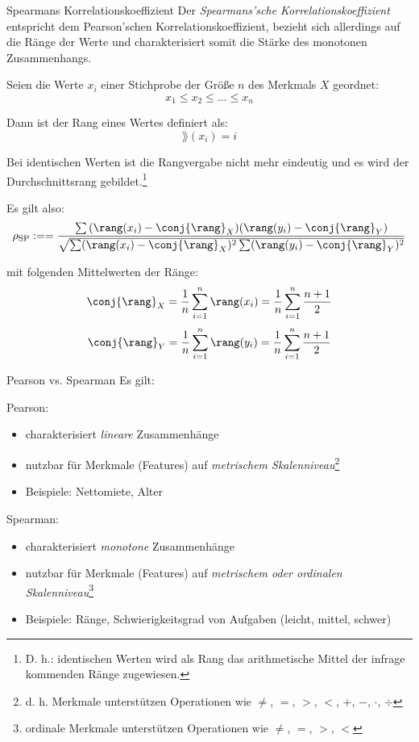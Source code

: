 \begin{defi}{Spearmans Korrelationskoeffizient}
    Der \emph{Spearmans'sche Korrelationskoeffizient} entspricht dem Pearson'schen Korrelationskoeffizient, bezieht sich allerdings auf die Ränge der Werte und charakterisiert somit die Stärke des monotonen Zusammenhangs.

    Seien die Werte $x_i$ einer Stichprobe der Größe $n$ des Merkmals $X$ geordnet:
    \[
        x_1 \leq x_2 \leq \ldots \leq x_n
    \]

    Dann ist der Rang eines Wertes definiert als:
    \[
        \rang(x_i) = i
    \]

    Bei identischen Werten ist die Rangvergabe nicht mehr eindeutig und es wird der Durchschnittsrang gebildet.\footnote{D. h.: identischen Werten wird als Rang das arithmetische Mittel der infrage kommenden Ränge zugewiesen.}

    Es gilt also:
    \[
        \rho_{\text{SP}} :=  = \frac{\sum{(\rang(x_i) - \conj{\rang}_X)(\rang(y_i) - \conj{\rang}_Y)}}{\sqrt{\sum(\rang(x_i) - \conj{\rang}_X)^2 \sum(\rang(y_i) - \conj{\rang}_Y)^2}}
    \]

    mit folgenden Mittelwerten der Ränge:
    \[
        \conj{\rang}_X = \frac{1}{n} \sum_{i=1}^{n} \rang(x_i) = \frac{1}{n} \sum_{i=1}^{n} \frac{n+1}{2}
    \]
    \[
        \conj{\rang}_Y = \frac{1}{n} \sum_{i=1}^{n} \rang(y_i) = \frac{1}{n} \sum_{i=1}^{n} \frac{n+1}{2}
    \]
\end{defi}

\begin{bonus}{Pearson vs. Spearman}
    Es gilt:

    Pearson:
    \begin{itemize}
        \item charakterisiert \emph{lineare} Zusammenhänge
        \item nutzbar für Merkmale (Features) auf \emph{metrischem Skalenniveau}\footnote{d. h. Merkmale unterstützen Operationen wie $\neq$, $=$, $>$, $<$, $+$, $-$, $\cdot$, $\div$}
        \item Beispiele: Nettomiete, Alter
    \end{itemize}

    Spearman:
    \begin{itemize}
        \item charakterisiert \emph{monotone} Zusammenhänge
        \item nutzbar für Merkmale (Features) auf \emph{metrischem oder ordinalen Skalenniveau}\footnote{ordinale Merkmale unterstützen Operationen wie $\neq$, $=$, $>$, $<$}
        \item Beispiele: Ränge, Schwierigkeitsgrad von Aufgaben (leicht, mittel, schwer)
    \end{itemize}
\end{bonus}


